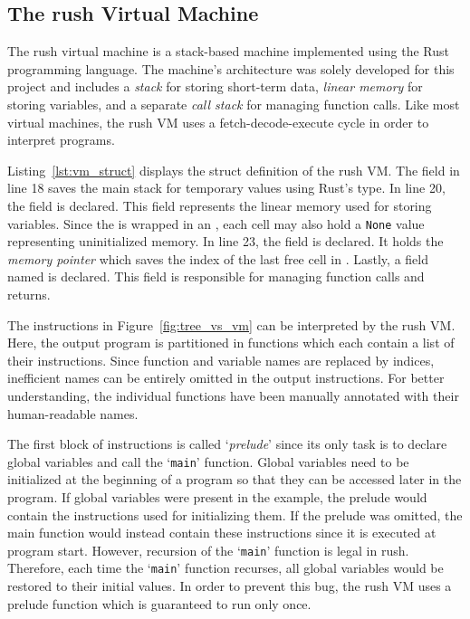 \subsection{The rush Virtual Machine}

The rush virtual machine is a stack-based machine implemented using the Rust programming language.
The machine's architecture was solely developed for this project and includes a \emph{stack} for storing short-term data, \emph{linear memory} for storing variables, and a separate \emph{call stack} for managing function calls.
Like most virtual machines, the rush VM uses a fetch-decode-execute cycle in order to interpret programs.



Listing~\ref{lst:vm_struct} displays the struct definition of the rush VM\@.
The  field in line 18 saves the main stack for temporary values using Rust's  type.
In line 20, the  field is declared.
This field represents the linear memory used for storing variables.
Since the  is wrapped in an , each cell may also hold a \texttt{None} value representing uninitialized memory.
In line 23, the  field is declared.
It holds the \emph{memory pointer} which saves the index of the last free cell in .
Lastly, a field named  is declared.
This field is responsible for managing function calls and returns.

The instructions in Figure~\ref{fig:tree_vs_vm} can be interpreted by the rush VM\@.
Here, the output program is partitioned in functions which each contain a list of their instructions.
Since function and variable names are replaced by indices, inefficient names can be entirely omitted in the output instructions.
For better understanding, the individual functions have been manually annotated with their human-readable names.

The first block of instructions is called `\emph{prelude}' since its only task is to declare global variables and call the `\texttt{main}' function.
Global variables need to be initialized at the beginning of a program so that they can be accessed later in the program.
If global variables were present in the example, the prelude would contain the instructions used for initializing them.
If the prelude was omitted, the main function would instead contain these instructions since it is executed at program start.
However, recursion of the `\texttt{main}' function is legal in rush.
Therefore, each time the `\texttt{main}' function recurses, all global variables would be restored to their initial values.
In order to prevent this bug, the rush VM uses a prelude function which is guaranteed to run only once.

